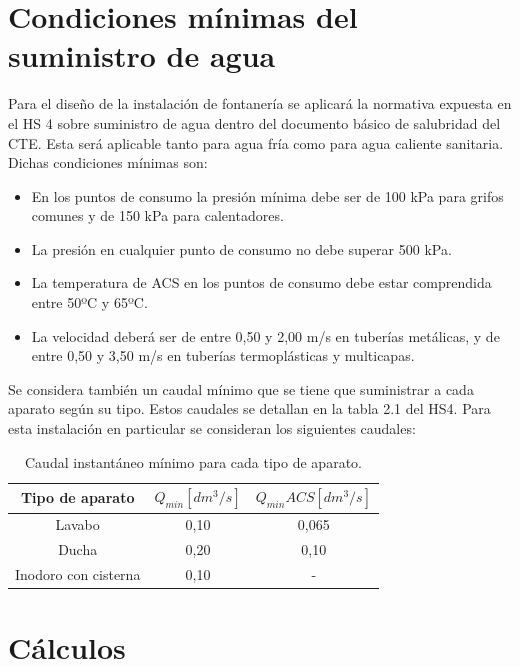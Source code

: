 \documentclass[../main.tex]{subfiles}
\begin{document}
\section{Condiciones mínimas del suministro de agua}
Para el diseño de la instalación de fontanería se aplicará la normativa expuesta en el HS 4 sobre suministro de agua dentro del documento básico de salubridad del CTE. Esta será aplicable tanto para agua fría como para agua caliente sanitaria. Dichas condiciones mínimas son:

\begin{itemize}
    \item En los puntos de consumo la presión mínima debe ser de 100 kPa para grifos comunes y de 150 kPa para calentadores.
    \item La presión en cualquier punto de consumo no debe superar 500 kPa.
    \item La temperatura de ACS en los puntos de consumo debe estar comprendida entre 50ºC y 65ºC.
    \item La velocidad deberá ser de entre 0,50 y 2,00 m/s en tuberías metálicas, y de entre 0,50 y 3,50 m/s en tuberías termoplásticas y multicapas.
\end{itemize}

Se considera también un caudal mínimo que se tiene que suministrar a cada aparato según su tipo. Estos caudales se detallan en la tabla 2.1 del HS4. Para esta instalación en particular se consideran los siguientes caudales:

\begin{table}[H]
    \centering
    \begin{tabular}{c|c|c}
         Tipo de aparato & $Q_{min} [dm^3/s]$ & $Q_{min} ACS [dm^3/s]$ \\ \hline
         Lavabo & 0,10 & 0,065 \\
         Ducha & 0,20 & 0,10 \\
         Inodoro con cisterna & 0,10 & - \\
    \end{tabular}
    \caption{Caudal instantáneo mínimo para cada tipo de aparato.}
\end{table}

\section{Cálculos}
\end{document}
